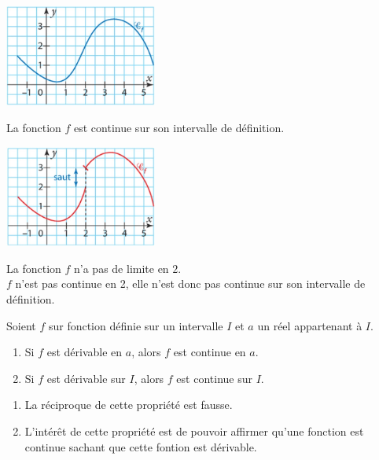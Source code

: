 \documentclass[a4paper,11pt,cours]{nsi} %
\begin{document}
\begin{exemple}[s]
	\begin{multicols}{2}
		\begin{center}
			\includegraphics[width=5cm]{fonction1.jpg}
		\end{center}
		La fonction $f$ est continue sur son intervalle de définition.\\

		\begin{center}
			\includegraphics[width=5cm]{fonction2.jpg}
		\end{center}
		La fonction $f$ n'a pas de limite en $2$.\\
		$f$ n'est pas continue en 2, elle n'est donc pas continue sur son intervalle de définition.
	\end{multicols}
\end{exemple}

\begin{propriete}
	Soient $f$ sur fonction définie sur un intervalle $I$ et $a$ un réel appartenant à $I$.
	\begin{enumerate}[label=\textbullet]
		\item Si $f$ est dérivable en $a$, alors $f$ est continue en $a$.
		\item Si $f$ est dérivable sur $I$, alors $f$ est continue sur $I$.
	\end{enumerate}
\end{propriete}

\begin{remarque}[s]
	\begin{enumerate}[label=\textbullet]
		\item La réciproque de cette propriété est fausse.
		\item L'intérêt de cette propriété est de pouvoir affirmer qu'une fonction est continue sachant que cette fontion est dérivable.
	\end{enumerate}
\end{remarque}
\end{document}
